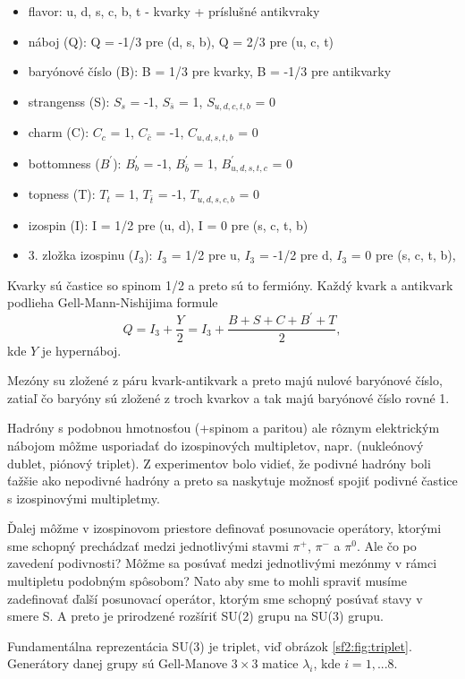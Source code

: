 \documentclass[../../main.tex]{subfiles}
\begin{document}
\begin{itemize}
\item flavor: u, d, s, c, b, t - kvarky + príslušné antikvraky
\item náboj (Q): Q = -1/3 pre (d, s, b), Q = 2/3 pre (u, c, t)
\item baryónové číslo (B): B = 1/3 pre kvarky, B = -1/3 pre antikvarky
\item strangenss (S): $S_s$ = -1, $S_{\bar{s}}$ = 1, $S_{u,d,c,t,b}$ = 0
\item charm (C): $C_c$ = 1, $C_{\bar{c}}$ = -1, $C_{u,d,s,t,b}$ = 0
\item bottomness ($B^{\prime}$): $B^{\prime}_b$ = -1, $B^{\prime}_{\bar{b}}$ = 1, $B^{\prime}_{u,d,s,t,c}$ = 0
\item topness (T): $T_t$ = 1, $T_{\bar{t}}$ = -1, $T_{u,d,s,c,b}$ = 0
\item izospin (I): I = 1/2 pre (u, d), I = 0 pre (s, c, t, b)
\item 3. zložka izospinu ($I_3$): $I_3$ = 1/2 pre u, $I_3$ = -1/2 pre d, $I_3$ = 0 pre (s, c, t, b),
\end{itemize}
Kvarky sú častice so spinom 1/2 a preto sú to fermióny. Každý kvark a antikvark podlieha Gell-Mann-Nishijima formule
\begin{equation}
Q=I_3+\frac{Y}{2}=I_3+\frac{B+S+C+B^{\prime}+T}{2},
\end{equation}
kde $Y$ je hypernáboj.

Mezóny su zložené z páru kvark-antikvark a preto majú nulové baryónové číslo, zatiaľ čo baryóny sú zložené z troch kvarkov a tak majú baryónové číslo rovné 1.

Hadróny s podobnou hmotnosťou (+spinom a paritou) ale rôznym elektrickým nábojom 
môžme usporiadať do izospinových multipletov, napr. (nukleónový dublet, piónový triplet). Z experimentov bolo vidieť, že podivné hadróny boli ťažšie ako nepodivné hadróny a preto sa naskytuje možnosť spojiť podivné častice s izospinovými multipletmy. 

Ďalej môžme v izospinovom priestore definovať posunovacie operátory, ktorými sme schopný prechádzať medzi jednotlivými stavmi $\pi^{+}$, $\pi^{-}$ a $\pi^{0}$. Ale čo po zavedení podivnosti? Môžme sa posúvať medzi jednotlivými mezónmy v rámci multipletu podobným spôsobom? Nato aby sme to mohli spraviť musíme zadefinovať ďalší posunovací operátor, ktorým sme schopný posúvať stavy v smere S. A preto je prirodzené rozšíriť SU(2) grupu na SU(3) grupu.

Fundamentálna reprezentácia SU(3) je triplet, viď obrázok \ref{sf2:fig:triplet}. Generátory danej grupy sú Gell-Manove $3 \times 3$ matice $\lambda_i$, kde $i=1,... 8$. 
\end{document}
